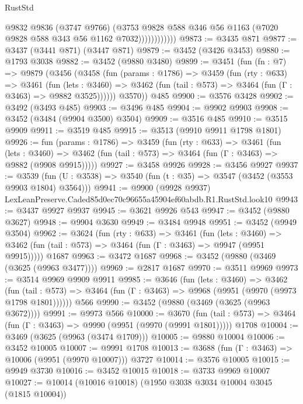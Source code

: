 \begin{lexlean}{RustStd}
\begin{coremodule}
                        @9832
                        @9836
                        (@3747 @9766)
                        (@3753
                          @9828
                          @588
                          @346
                          @56
                          @1163
                          (@7020 @9828 @588 @343 @56 @1162 @7032))))))))))))
@9873 := @3435 @871
@9877 := @3437 (@3441 @871) (@3447 @871)
@9879 := @3452 (@3426 @3453)
@9880 := @1793 @3038
@9882 := @3452 (@9880 @3480)
@9899 := @3451
    (fun (fn : @7) =>
    @9879
      (@3456
        (@3458
          (fun (params : @1786) =>
          @3459
            (fun (rty : @633) =>
            @3461
              (fun (lets : @3460) =>
              @3462 (fun (tail : @573) => @3464 (fun (Γ : @3463) => @9882 @3525))))))
        @3570))
    @485
@9900 := @3576 @3428
@9902 := @3492 (@3493 @485)
@9903 := @3496 @485
@9904 := @9902 @9903
@9908 := @3452 (@3484 (@9904 @3500) @3504)
@9909 := @3516 @485
@9910 := @3515 @9909
@9911 := @3519 @485
@9915 := @3513 (@9910 @9911 @1798 @1801)
@9926 := fun (params : @1786) =>
  @3459
    (fun (rty : @633) =>
    @3461
      (fun (lets : @3460) =>
      @3462 (fun (tail : @573) => @3464 (fun (Γ : @3463) => @9882 (@9908 @9915)))))
@9927 := @3458 @9926
@9928 := @3456 @9927
@9937 := @3539 (fun (U : @3538) => @3540 (fun (t : @35) => @3547 (@3452 (@3553 @9903 @1804) @3564)))
@9941 := @9900 (@9928 @9937) LexLeanPreserve.Caded85d0ec70c96655a45904ef60abdb.R1.RustStd.look10
@9943 := @3437 @9927 @9937
@9945 := @3621 @9926 @543
@9947 := @3452 (@9880 @3627)
@9948 := @9904 @3630
@9949 := @3484 @9948
@9951 := @3452 (@9949 @3504)
@9962 := @3624
    (fun (rty : @633) =>
    @3461
      (fun (lets : @3460) =>
      @3462 (fun (tail : @573) => @3464 (fun (Γ : @3463) => @9947 (@9951 @9915)))))
    @1687
@9963 := @3472 @1687
@9968 := @3452 (@9880 (@3469 (@3625 (@9963 @3477))))
@9969 := @2817 @1687
@9970 := @3511 @9969
@9973 := @3514 @9969 @9909 @9911
@9985 := @3646
    (fun (lets : @3460) =>
    @3462
      (fun (tail : @573) => @3464 (fun (Γ : @3463) => @9968 (@9951 (@9970 (@9973 @1798 @1801))))))
    @566
@9990 := @3452 (@9880 (@3469 (@3625 (@9963 @3672))))
@9991 := @9973 @566
@10000 := @3670
    (fun (tail : @573) => @3464 (fun (Γ : @3463) => @9990 (@9951 (@9970 (@9991 @1801)))))
    @1708
@10004 := @3469 (@3625 (@9963 (@3474 @1709)))
@10005 := @9880 @10004
@10006 := @3452 @10005
@10007 := @9991 @1708
@10013 := @3688 (fun (Γ : @3463) => @10006 (@9951 (@9970 @10007))) @3727
@10014 := @3576 @10005
@10015 := @9949 @3730
@10016 := @3452 @10015
@10018 := @3733 @9969 @10007
@10027 := @10014 (@10016 @10018) (@1950 @3038 @3034 @10004 @3045 (@1815 @10004))

\end{coremodule}
\end{lexlean}

